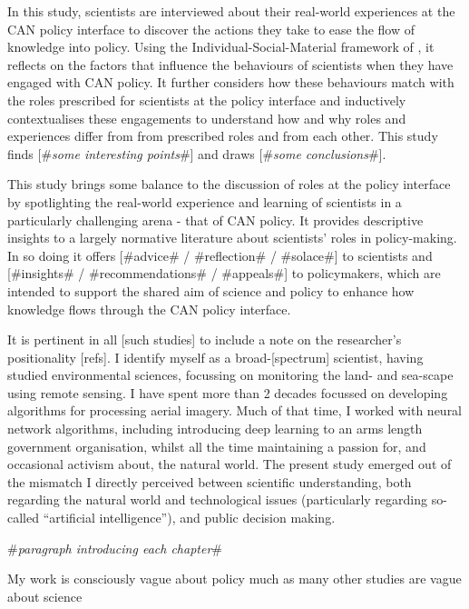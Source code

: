 In this study, scientists are interviewed about their real-world experiences at the CAN policy interface to discover the actions they take to ease the flow of knowledge into policy. Using the Individual-Social-Material framework of \textcite{DarntonH2013}, it reflects on the factors that influence the behaviours of scientists when they have engaged with CAN policy. It further considers how these behaviours match with the roles prescribed for scientists at the policy interface and inductively contextualises these engagements to understand how and why roles and experiences differ from from prescribed roles and from each other. This study finds [\#\emph{some interesting points}\#] and draws [\#\emph{some conclusions}\#]. 

This study brings some balance to the discussion of roles at the policy interface by spotlighting the real-world experience and learning of scientists in a particularly challenging arena - that of CAN policy. It provides descriptive insights to a largely normative literature about scientists' roles in policy-making. In so doing it offers [\#advice\# / \#reflection\# / \#solace\#] to scientists and [\#insights\# / \#recommendations\# / \#appeals\#] to policymakers, which are intended to support the shared aim of science and policy to enhance how knowledge flows through the CAN policy interface.

It is pertinent in all [such studies] to include a note on the researcher's positionality [refs]. I identify myself as a broad-[spectrum] scientist, having studied environmental sciences, focussing on monitoring the land- and sea-scape using remote sensing. I have spent more than 2 decades focussed on developing algorithms for processing aerial imagery. Much of that time, I worked with neural network algorithms, including introducing deep learning to an arms length government organisation, whilst all the time maintaining a passion for, and occasional activism about, the natural world. The present study emerged out of the mismatch I directly perceived between scientific understanding, both regarding the natural world and technological issues (particularly regarding so-called ``artificial intelligence''), and public decision making.

\#\emph{paragraph introducing each chapter}\#




My work is consciously vague about policy much as many other studies are vague about science